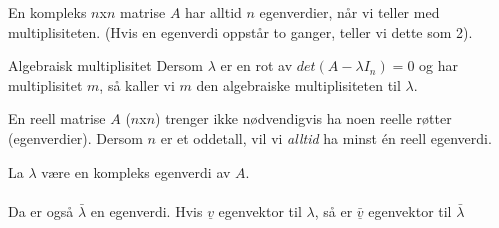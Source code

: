 \documentclass[11pt, a4paper, norsk]{article}
\begin{document}
        \begin{Theorem}{}{}
            En kompleks $n$x$n$ matrise $A$ har alltid $n$ egenverdier, når vi teller med multiplisiteten. (Hvis en egenverdi oppstår to ganger, teller vi dette som 2).
        \end{Theorem}
        
        \begin{Definition}{Algebraisk multiplisitet}{}
            Dersom $\lambda$ er en rot av $det(A - \lambda I_{n}) = 0$ og har multiplisitet $m$, så kaller vi $m$ den algebraiske multiplisiteten til $\lambda$. 
        \end{Definition}

        \begin{Theorem}{}{}
            En reell matrise $A$ ($n$x$n$) trenger ikke nødvendigvis ha noen reelle røtter (egenverdier). Dersom $n$ er et oddetall, vil vi \textit{alltid} ha minst én reell egenverdi.
        \end{Theorem}

        \begin{Theorem}{}{}
            La $\lambda$ være en kompleks egenverdi av $A$. 
            \\ \\
            Da er også $\bar{\lambda}$ en egenverdi. Hvis $\underline{v}$ egenvektor til $\lambda$, så er $\bar{\underline{v}}$ egenvektor til $\bar{\lambda}$
        \end{Theorem}
\end{document}
